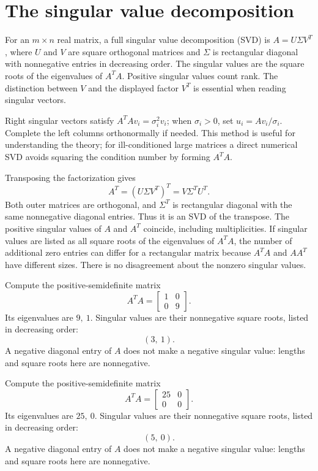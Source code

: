 \section{The singular value decomposition}
For an $m\times n$ real matrix, a full singular value decomposition (SVD) is $A=U\Sigma V^T$, where $U$ and $V$ are square orthogonal matrices and $\Sigma$ is rectangular diagonal with nonnegative entries in decreasing order. The singular values are the square roots of the eigenvalues of $A^TA$. Positive singular values count rank. The distinction between $V$ and the displayed factor $V^T$ is essential when reading singular vectors.

Right singular vectors satisfy $A^TAv_i=\sigma_i^2v_i$; when $\sigma_i>0$, set $u_i=Av_i/\sigma_i$. Complete the left columns orthonormally if needed. This method is useful for understanding the theory; for ill-conditioned large matrices a direct numerical SVD avoids squaring the condition number by forming $A^TA$.

Transposing the factorization gives
\[
A^T=(U\Sigma V^T)^T=V\Sigma^TU^T.
\]
Both outer matrices are orthogonal, and $\Sigma^T$ is rectangular diagonal with the same nonnegative diagonal entries. Thus it is an SVD of the transpose. The positive singular values of $A$ and $A^T$ coincide, including multiplicities. If singular values are listed as all square roots of the eigenvalues of $A^TA$, the number of additional zero entries can differ for a rectangular matrix because $A^TA$ and $AA^T$ have different sizes. There is no disagreement about the nonzero singular values.

Compute the positive-semidefinite matrix
\[A^TA=\begin{bmatrix}1&0\\0&9\end{bmatrix}.\]
Its eigenvalues are $9,\ 1$. Singular values are their nonnegative square roots, listed in decreasing order:
\[(3,\ 1).\]
A negative diagonal entry of $A$ does not make a negative singular value: lengths and square roots here are nonnegative.

Compute the positive-semidefinite matrix
\[A^TA=\begin{bmatrix}25&0\\0&0\end{bmatrix}.\]
Its eigenvalues are $25,\ 0$. Singular values are their nonnegative square roots, listed in decreasing order:
\[(5,\ 0).\]
A negative diagonal entry of $A$ does not make a negative singular value: lengths and square roots here are nonnegative.

